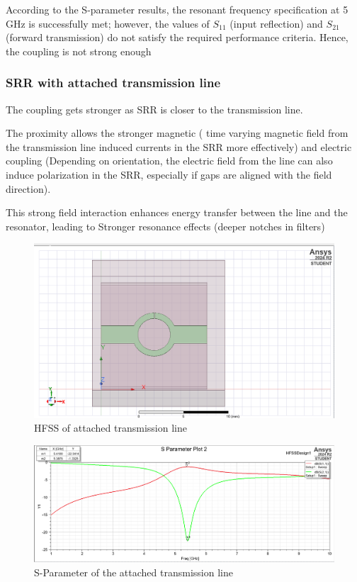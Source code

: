 \documentclass[conference]{IEEEtran}
\begin{document}
According to the S-parameter results, the resonant frequency specification at 5\,GHz is successfully met; however, the values of \( S_{11} \) (input reflection) and \( S_{21} \) (forward transmission) do not satisfy the required performance criteria. Hence, the coupling is not strong enough

\subsubsection{SRR with attached transmission line}
The coupling gets stronger as SRR is closer to the transmission line.

The proximity allows the stronger magnetic ( time varying magnetic field from the transmission line induced currents in the SRR more effectively)  and electric coupling (Depending on orientation, the electric field from the line can also induce polarization in the SRR, especially if gaps are aligned with the field direction).

This strong field interaction enhances energy transfer between the line and the resonator, leading to Stronger resonance effects (deeper notches in filters)

\begin{figure}
    \centering
    \includegraphics[width=1\linewidth]{Images/transmissionthing.png}
    \caption{HFSS of attached transmission line}
\end{figure}
\begin{figure}
    \centering
    \includegraphics[width=1\linewidth]{Images/attached tranmission line.png}
    \caption{S-Parameter of the attached transmission line}
\end{figure}
\end{document}
